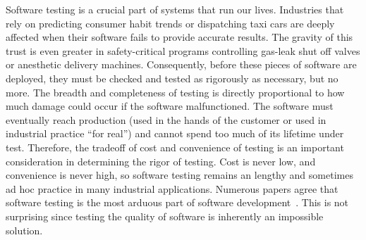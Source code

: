 
Software testing is a crucial part of systems that run our lives. Industries that rely on predicting consumer habit trends or dispatching taxi cars are deeply affected when their software fails to provide accurate results. The gravity of this trust is even greater in safety-critical programs controlling gas-leak shut off valves or anesthetic delivery machines. Consequently, before these pieces of software are deployed, they must be checked and tested as rigorously as necessary, but no more. The breadth and completeness of testing is directly proportional to how much damage could occur if the software malfunctioned. The software must eventually reach production (used in the hands of the customer or used in industrial practice ``for real'') and cannot spend too much of its lifetime under test. Therefore, the tradeoff of cost and convenience of testing is an important consideration in determining the rigor of testing. Cost is never low, and convenience is never high, so software testing remains an lengthy and sometimes ad hoc practice in many industrial applications. Numerous papers agree that software testing is the most arduous part of software development~\cite{Murphy:2007:PRT:1292414.1292425,Haller:2010:TDC:1838126.1838132,Muslu:2015:PDE:2771783.2771792,Tiwari:2013:RRT:2439976.2439982,Gupta:2011:MBA:2002931.2002932,Zeller:2017:STS:3105427.3105438,Misailovic:2007:PTG:1287624.1287645,Garousi:2017:IWA:3084226.3084264,Kassab-deFranco-Laplante}. This is not surprising since testing the quality of software is inherently an impossible solution.

